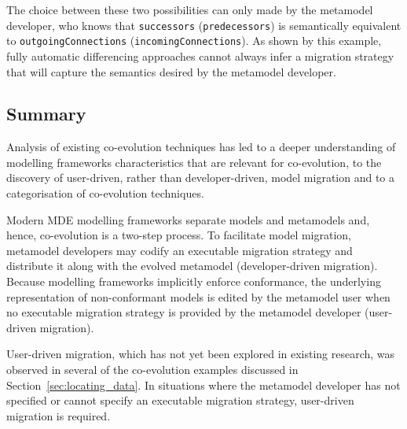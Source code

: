 The choice between these two possibilities can only made by the metamodel developer, who knows that \texttt{successors} (\texttt{predecessors}) is semantically equivalent to \texttt{outgoingConnections} (\texttt{incomingConnections}). As shown by this example, fully automatic differencing approaches cannot always infer a migration strategy that will capture the semantics desired by the metamodel developer.


\subsection{Summary}
Analysis of existing co-evolution techniques has led to a deeper understanding of modelling frameworks characteristics that are relevant for co-evolution, to the discovery of user-driven, rather than developer-driven, model migration and to a categorisation of co-evolution techniques.

Modern MDE modelling frameworks separate models and metamodels and, hence, co-evolution is a two-step process. To facilitate model migration, metamodel developers may codify an executable migration strategy and distribute it along with the evolved metamodel (developer-driven migration). Because modelling frameworks implicitly enforce conformance, the underlying representation of non-conformant models is edited by the metamodel user when no executable migration strategy is provided by the metamodel developer (user-driven migration).

User-driven migration, which has not yet been explored in existing research, was observed in several of the co-evolution examples discussed in Section~\ref{sec:locating_data}. In situations where the metamodel developer has not specified or cannot specify an executable migration strategy, user-driven migration is required.

